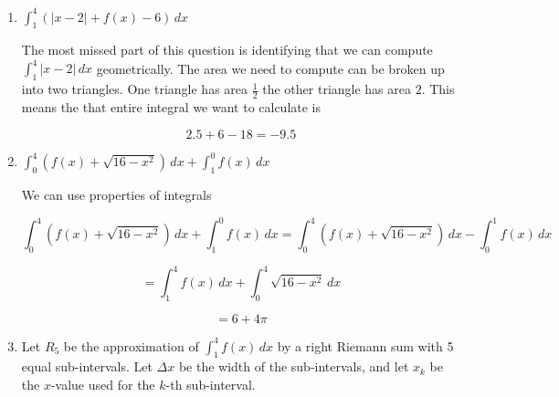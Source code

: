 \documentclass{article}
\begin{document}
\begin{enumerate}
\begin{enumerate}
\begin{solution}
$$ \displaystyle\int_{-7}^{-4} f(x+8)\, dx =\displaystyle\int_{1}^{4} f(x)\, dx =6  $$

\end{solution} 

\vfill


\item $\displaystyle\int_1^4\left(|x-2| +f(x) - 6\right)\, dx$\vfill

\begin{solution} 

The most missed part of this question is identifying that we can compute $\displaystyle\int_1^4|x-2| \,dx$ geometrically. The area we need to compute can be broken up into two triangles. One triangle has area $\frac{1}{2}$ the other triangle has area $2$. This means the that entire integral we want to calculate is 

$$ 2.5 +6- 18= -9.5$$ 

\end{solution}

\item $\displaystyle\int_0^4\left(f(x) + \sqrt{16-x^2}\right) \, dx +\int_1^0f(x)\, dx$\vfill
\begin{solution} 
We can use properties of integrals 

$$\displaystyle\int_0^4\left(f(x) + \sqrt{16-x^2}\right) \, dx +\int_1^0f(x)\, dx = \displaystyle\int_0^4\left(f(x) + \sqrt{16-x^2}\right) \, dx -\int_0^1f(x)\, dx$$

$$ = \displaystyle\int_1^4f(x)  \, dx +\int_0^4 \sqrt{16-x^2} \, dx$$

$$ = 6 + 4 \pi$$ 

\end{solution} 

\pspace{\newpage}



\item Let $R_5$ be the approximation of  $\displaystyle\int_1^4 f(x) \, dx$ by a right Riemann sum with 5 equal sub-intervals. Let $\Delta x$ be the width of the sub-intervals, and let $x_k$ be the $x$-value used for the $k$-th sub-interval.  


\end{enumerate}
\end{enumerate}
\end{document}
